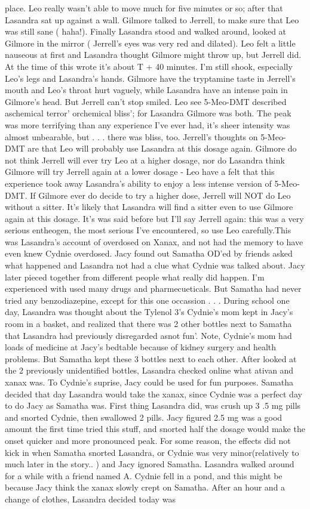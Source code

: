 \documentclass[12pt]{book}
\begin{document}
place. Leo really wasn't able to move much for five minutes or so; after that Lasandra sat up against a wall. Gilmore talked to Jerrell, to make sure that Leo was still sane ( haha!). Finally Lasandra stood and walked around, looked at Gilmore in the mirror ( Jerrell's eyes was very red and dilated). Leo felt a little nauseous at first and Lasandra thought Gilmore might throw up, but Jerrell did. At the time of this wrote it's about T + 40 minutes. I'm still shook, especially Leo's legs and Lasandra's hands. Gilmore have the tryptamine taste in Jerrell's mouth and Leo's throat hurt vaguely, while Lasandra have an intense pain in Gilmore's head. But Jerrell can't stop smiled. Leo see 5-Meo-DMT described aschemical terror' orchemical bliss'; for Lasandra Gilmore was both. The peak was more terrifying than any experience I've ever had, it's sheer intensity was almost unbearable, but . . .  there was bliss, too. Jerrell's thoughts on 5-Meo-DMT are that Leo will probably use Lasandra at this dosage again. Gilmore do not think Jerrell will ever try Leo at a higher dosage, nor do Lasandra think Gilmore will try Jerrell again at a lower dosage - Leo have a felt that this experience took away Lasandra's ability to enjoy a less intense version of 5-Meo-DMT. If Gilmore ever do decide to try a higher dose, Jerrell will NOT do Leo without a sitter. It's likely that Lasandra will find a sitter even to use Gilmore again at this dosage. It's was said before but I'll say Jerrell again: this was a very serious entheogen, the most serious I've encountered, so use Leo carefully.This was Lasandra's account of overdosed on Xanax, and not had the memory to have even knew Cydnie overdosed. Jacy found out Samatha OD'ed by friends asked what happened and Lasandra not had a clue what Cydnie was talked about. Jacy later pieced together from different people what really did happen. I'm experienced with used many drugs and pharmecueticals. But Samatha had never tried any benzodiazepine, except for this one occassion . . .  During school one day, Lasandra was thought about the Tylenol 3's Cydnie's mom kept in Jacy's room in a basket, and realized that there was 2 other bottles next to Samatha that Lasandra had previously disregarded asnot fun'. Note, Cydnie's mom had loads of medicine at Jacy's bedtable because of kidney surgery and health problems. But Samatha kept these 3 bottles next to each other. After looked at the 2 previously unidentified bottles, Lasandra checked online what ativan and xanax was. To Cydnie's suprise, Jacy could be used for fun purposes. Samatha decided that day Lasandra would take the xanax, since Cydnie was a perfect day to do Jacy as Samatha was. First thing Lasandra did, was crush up 3 .5 mg pills and snorted Cydnie, then swallowed 2 pills. Jacy figured 2.5 mg was a good amount the first time tried this stuff, and snorted half the dosage would make the onset quicker and more pronounced peak. For some reason, the effects did not kick in when Samatha snorted Lasandra, or Cydnie was very minor(relatively to much later in the story.. ) and Jacy ignored Samatha. Lasandra walked around for a while with a friend named A. Cydnie fell in a pond, and this might be because Jacy think the xanax slowly crept on Samatha. After an hour and a change of clothes, Lasandra decided today was 
\end{document}
